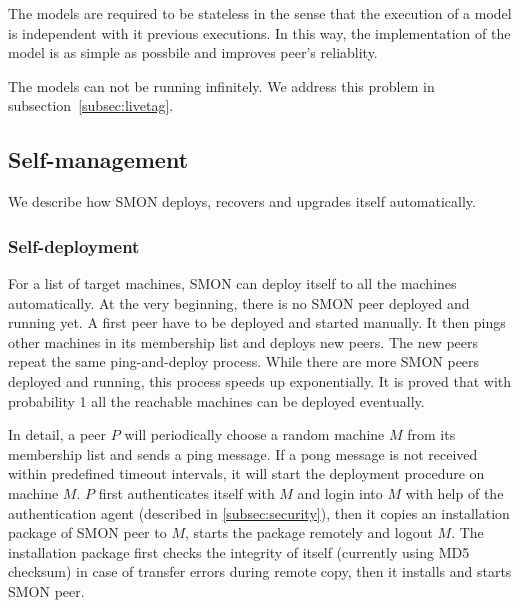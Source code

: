 {The models are required to be stateless in the sense that
the execution of a model is independent with it previous
executions. In this way, the implementation of the model is
as simple as possbile and improves peer's reliablity.



The models can not be running infinitely. We address this
problem in subsection~\ref{subsec:livetag}.
}

\subsection{Self-management}

We describe how SMON deploys, recovers and upgrades itself
automatically.

\subsubsection*{Self-deployment}

For a list of target machines, SMON can deploy itself to all
the machines automatically. At the very beginning, there is
no SMON peer deployed and running yet. A first peer have to
be deployed and started manually. It then pings other
machines in its membership list and deploys new peers. The
new peers repeat the same ping-and-deploy process. While
there are more SMON peers deployed and running, this process
speeds up exponentially. It is proved that with probability
1 all the reachable machines can be deployed
eventually\cite{Eugster2004}.


In detail, a peer $P$ will periodically choose a random
machine $M$ from its membership list and sends a ping
message. If a pong message is not received within predefined
timeout intervals, it will start the deployment procedure on
machine $M$. $P$ first authenticates itself with $M$ and
login into $M$ with help of the authentication agent
(described in \ref{subsec:security}), then it copies an
installation package of SMON peer to $M$, starts the package
remotely and logout $M$. The installation package first
checks the integrity of itself (currently using MD5 checksum)
in case of transfer errors during remote copy, then it
installs and starts SMON peer.

